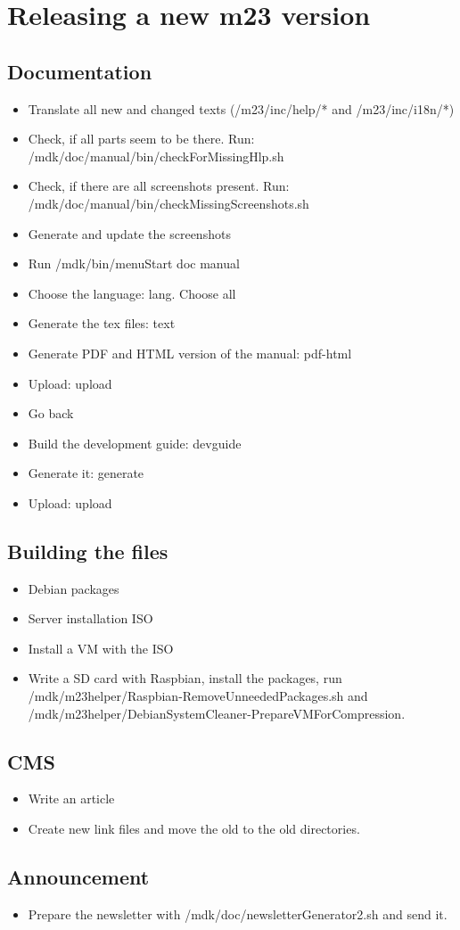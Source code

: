 \section{Releasing a new m23 version}

\subsection{Documentation}
\begin{itemize}
\item Translate all new and changed texts (/m23/inc/help/* and /m23/inc/i18n/*)
\item Check, if all parts seem to be there. Run: /mdk/doc/manual/bin/checkForMissingHlp.sh
\item Check, if there are all screenshots present. Run: /mdk/doc/manual/bin/checkMissingScreenshots.sh
\item Generate and update the screenshots
\item Run /mdk/bin/menuStart \Rightarrow doc \Rightarrow manual
\item Choose the language: \Rightarrow lang. Choose all
\item Generate the tex files: \Rightarrow text
\item Generate PDF and HTML version of the manual: \Rightarrow pdf-html
\item Upload: \Rightarrow upload
\item Go back
\item Build the development guide: \Rightarrow devguide
\item Generate it: \Rightarrow generate
\item Upload: \Rightarrow upload
\end{itemize}



\subsection{Building the files}
\begin{itemize}
\item Debian packages
\item Server installation ISO
\item Install a VM with the ISO
\item Write a SD card with Raspbian, install the packages, run /mdk/m23helper/Raspbian-RemoveUnneededPackages.sh and /mdk/m23helper/DebianSystemCleaner-PrepareVMForCompression.
\end{itemize}


\subsection{CMS}
\begin{itemize}
\item Write an article
\item Create new link files and move the old to the old directories.
\end{itemize}


\subsection{Announcement}
\begin{itemize}
\item Prepare the newsletter with /mdk/doc/newsletterGenerator2.sh and send it.
\end{itemize}

